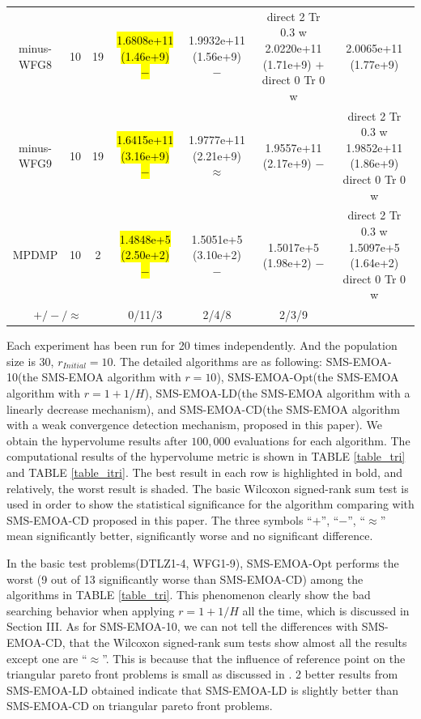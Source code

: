 \documentclass[conference]{IEEEtran}
\newcommand{\semitextbf}[1]{%
	\pdfliteral direct {2 Tr 0.3 w} %
	#1%
	\pdfliteral direct {0 Tr 0 w}%
}
\begin{document}
\begin{table}[!t]
\begin{tabular}{ccccccc}
      \multirow{1}{*}{minus-WFG8}&10&19&\hl{1.6808e+11 (1.46e+9) $-$}&1.9932e+11 (1.56e+9) $-$&\semitextbf{2.0220e+11 (1.71e+9) $+$}&2.0065e+11 (1.77e+9)\\
      \multirow{1}{*}{minus-WFG9}&10&19&\hl{1.6415e+11 (3.16e+9) $-$}&1.9777e+11 (2.21e+9) $\approx$&1.9557e+11 (2.17e+9) $-$&\semitextbf{1.9852e+11 (1.86e+9)}\\
      \hline
      \multirow{1}{*}{MPDMP}&10&2&\hl{1.4848e+5 (2.50e+2) $-$}&1.5051e+5 (3.10e+2) $-$&1.5017e+5 (1.98e+2) $-$&\semitextbf{1.5097e+5 (1.64e+2)}\\
      \midrule
      \multicolumn{3}{c}{$+/-/\approx$}&0/11/3&2/4/8&2/3/9&\\
      \bottomrule
    \end{tabular}
  \end{table}

Each experiment has been run for 20 times independently. 
And the population size is $30$, $r_{Initial}=10$.
The detailed algorithms are as following: 
SMS-EMOA-10(the SMS-EMOA\cite{smsemoa} algorithm with $r=10$),
SMS-EMOA-Opt(the SMS-EMOA algorithm with $r=1+1/H$),
SMS-EMOA-LD(the SMS-EMOA algorithm with a linearly decrease mechanism),
and SMS-EMOA-CD(the SMS-EMOA algorithm with a weak convergence detection mechanism, proposed in this paper).
We obtain the hypervolume results after $100,000$ evaluations for each algorithm. 
The computational results of the hypervolume metric is shown in TABLE \ref{table_tri} and TABLE \ref{table_itri}. 
The best result in each row is highlighted in bold, and relatively, the worst result is shaded. 
The basic Wilcoxon signed-rank sum test is used in order to show the statistical significance for the algorithm
comparing with SMS-EMOA-CD proposed in this paper. The three symbols ``$+$'', ``$-$'', ``$\approx$'' 
mean significantly better, significantly worse and no significant difference.

In the basic test problems(DTLZ1-4, WFG1-9), 
SMS-EMOA-Opt performs the worst (9 out of 13 significantly worse than SMS-EMOA-CD) among the algorithms in TABLE \ref{table_tri}. 
This phenomenon clearly show the bad searching behavior when applying $r=1+1/H$ all the time, 
which is discussed in Section III. 
As for SMS-EMOA-10, we can not tell the differences with SMS-EMOA-CD, 
that the Wilcoxon signed-rank sum tests show almost all the results except one are ``$\approx$''. 
This is because that the influence of reference point on the triangular pareto front problems is small as discussed in \cite{hisao:RPexplanation}. 
2 better results from SMS-EMOA-LD obtained indicate that SMS-EMOA-LD is slightly better than SMS-EMOA-CD on triangular pareto front problems. 
\end{document}
